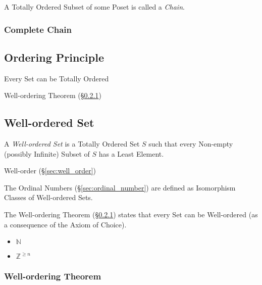 A Totally Ordered Subset of some Poset is called a \emph{Chain}.



\subsubsection{Complete Chain}\label{sec:complete_chain}



\subsection{Ordering Principle}\label{sec:ordering_principle}

Every Set can be Totally Ordered

Well-ordering Theorem (\S\ref{sec:wellorder_theorem})



\subsection{Well-ordered Set}\label{sec:wellordered_set}

A \emph{Well-ordered Set} is a Totally Ordered Set $S$ such that every
Non-empty (possibly Infinite) Subset of $S$ has a Least Element.

Well-order (\S\ref{sec:well_order})

The Ordinal Numbers (\S\ref{sec:ordinal_number}) are defined as
Isomorphism Classes of Well-ordered Sets.

The Well-ordering Theorem (\S\ref{sec:wellorder_theorem}) states that
every Set can be Well-ordered (as a consequence of the Axiom of
Choice).

\begin{itemize}
  \item $\mathbb{N}$
  \item $\mathbb{Z}^{\geq n}$
\end{itemize}



\subsubsection{Well-ordering Theorem}\label{sec:wellorder_theorem}

